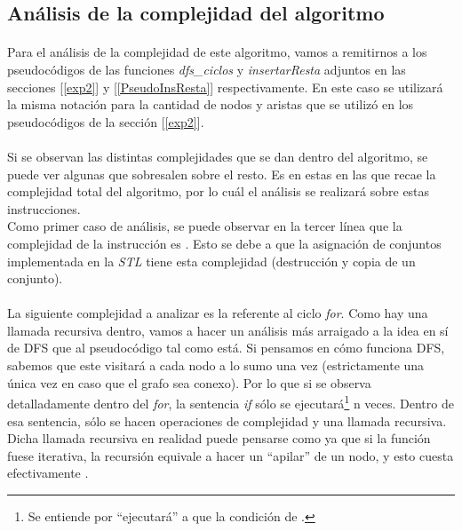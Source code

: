 \subsection{Análisis de la complejidad del algoritmo}
\label{complejidad2}

\paragraph{}
Para el análisis de la complejidad de este algoritmo, vamos a remitirnos a los pseudocódigos de las funciones \textit{dfs\_ciclos} y \textit{insertarResta} adjuntos en las secciones [\ref{exp2}] y [\ref{PseudoInsResta}] respectivamente. En este caso se utilizará la misma notación para la cantidad de nodos y aristas que se utilizó en los pseudocódigos de la sección [\ref{exp2}].

\paragraph{}
Si se observan las distintas complejidades que se dan dentro del algoritmo, se puede ver algunas que sobresalen sobre el resto. Es en estas en las que recae la complejidad total del algoritmo, por lo cuál el análisis se realizará sobre estas instrucciones.\\
Como primer caso de análisis, se puede observar en la tercer línea que la complejidad de la instrucción es . Esto se debe a que la asignación de conjuntos implementada en la \textit{STL} tiene esta complejidad (destrucción y copia de un conjunto).

\paragraph{}
La siguiente complejidad a analizar es la referente al ciclo \textit{for}. Como hay una llamada recursiva dentro, vamos a hacer un análisis más arraigado a la idea en sí de DFS que al pseudocódigo tal como está. Si pensamos en cómo funciona DFS, sabemos que este visitará a cada nodo a lo sumo una vez (estrictamente una única vez en caso que el grafo sea conexo). Por lo que si se observa detalladamente dentro del \textit{for}, la sentencia \textit{if} sólo se ejecutará\footnote{Se entiende por ``ejecutará'' a que la condición de \true.} n veces. Dentro de esa sentencia, sólo se hacen operaciones de complejidad  y una llamada recursiva. Dicha llamada recursiva en realidad puede pensarse como  ya que si la función fuese iterativa, la recursión equivale a hacer un ``apilar'' de un nodo, y esto cuesta efectivamente .

